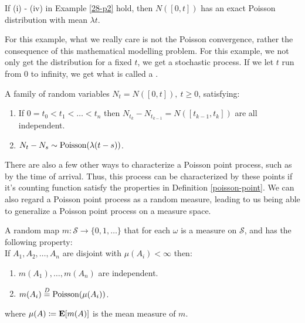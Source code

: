 \documentclass[../main/main.tex]{subfiles}
\begin{document}
\begin{theorem}
	If (i) - (iv) in Example \ref{28-p2} hold, then $N([0,t])$ has an exact Poisson distribution with mean $\lambda t$.
\end{theorem}

For this example, what we really care is not the Poisson convergence, rather the consequence of this mathematical modelling problem. For this example, we not only get the distribution for a fixed $t$, we get a stochastic process. If we let $t$ run from $0$ to infinity, we get what is called a .

\begin{definition}\label{poisson-point}
	A family of random variables $N_t = N([0,t]),~ t \geq 0$, satisfying:
	\begin{enumerate}
		\item If $0= t_0 < t_1 < \ldots < t_{n}$ then $N_{t_k}-N_{t_{k-1}} = N([t_{k-1},t_{k}])$ are all independent.
		\item $N_t - N_s \sim \text{Poisson}(\lambda(t-s))$.
	\end{enumerate}
\end{definition}

There are also a few other ways to characterize a Poisson point process, such as by the time of arrival. Thus, this process can be characterized by these points if it's counting function satisfy the properties in Definition \ref{poisson-point}. We can also regard a Poisson point process as a random measure, leading to us being able to generalize a Poisson point process on a measure space.


\begin{definition}
	A random map $m : \mathscr{S} \to \{0,1,\ldots \}$ that for each $\omega$ is a measure on $\mathscr{S}$, and has the following property: \\
	If $A_1, A_2, \ldots, A_n$ are disjoint with $\mu(A_i) < \infty$ then:
	\begin{enumerate}
		\item $m(A_1), \ldots , m(A_n)$ are independent.
		\item $m(A_i) \overset{D}{=} \text{Poisson}(\mu(A_i))$.
	\end{enumerate}
	where $\mu(A) \coloneqq \text{\textbf{E}}[m(A)]$ is the mean measure of $m$.
\end{definition}
\end{document}
